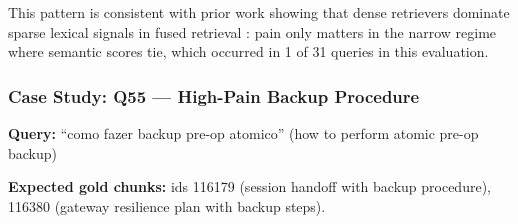 This pattern is consistent with prior work showing that dense retrievers dominate sparse
lexical signals in fused retrieval \cite{thakur2021beir}: pain only matters in the narrow
regime where semantic scores tie, which occurred in 1 of 31 queries in this evaluation.

\subsubsection{Case Study: Q55 --- High-Pain Backup Procedure}

\textbf{Query:} ``como fazer backup pre-op atomico'' (how to perform atomic pre-op backup)

\textbf{Expected gold chunks:} ids 116179 (session handoff with backup procedure), 116380
(gateway resilience plan with backup steps).

\begin{table}[h]
  \caption{Q55 pain\_real retrieval --- nDCG@10 = 1.000.}
  \label{tab:q55real}
  \centering
\end{table}

\begin{table}[h]
  \caption{Q55 pain\_uniform retrieval --- nDCG@10 = 0.651.}
  \label{tab:q55uniform}
  \centering
\end{table}

